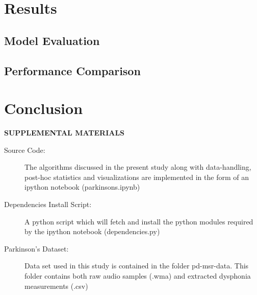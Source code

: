 \documentclass[12pt]{article}
\begin{document}
\section{Results}
\subsection{Model Evaluation}

\subsection{Performance Comparison}

\section{Conclusion}
\label{sec:conc}


\bigskip
\begin{center}
{\large\bf SUPPLEMENTAL MATERIALS}
\end{center}

\begin{description}

\item[Source Code:] The algorithms discussed in the present study along with data-handling, post-hoc statistics and visualizations are implemented in the form of an ipython notebook (parkinsons.ipynb)

\item[Dependencies Install Script:] A python script which will fetch and install the  python modules required by the ipython notebook (dependencies.py)

\item[Parkinson's Dataset:] Data set used in this study is contained in the folder pd-msr-data. This folder contains both raw audio samples (.wma) and extracted dysphonia measurements (.csv)

\end{description}



\end{document}
